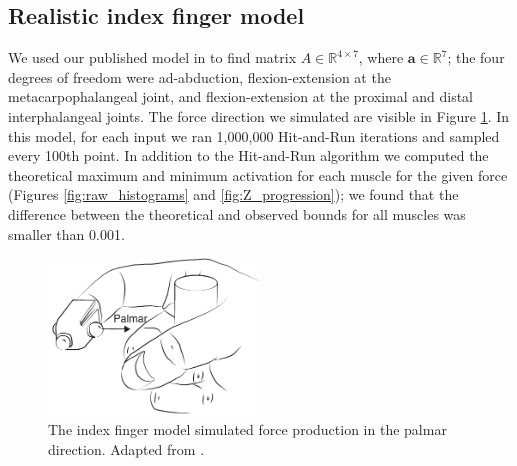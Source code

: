 \subsection{Realistic index finger model}
\label{ss:finger}
We used our published model in \cite{Valero-Cuevas1998Large} to find matrix $A \in \mathbb{R}^{4 \times 7}$, where $\textbf{a} \in \mathbb{R}^7$; the four degrees of freedom were ad-abduction, flexion-extension at the metacarpophalangeal joint, and flexion-extension at the proximal and distal interphalangeal joints.
The force direction we simulated are visible in Figure \ref{fig:finger}.
In this model, for each input we ran 1,000,000 Hit-and-Run iterations and sampled every 100th point.
In addition to the Hit-and-Run algorithm we computed the theoretical maximum and minimum activation for each muscle for the given force (Figures \ref{fig:raw_histograms} and \ref{fig:Z_progression}); we found that the difference between the theoretical and observed bounds for all muscles was smaller than 0.001.

\begin{figure}[htbp]
  \centering
  \includegraphics[width=0.5\textwidth]{sections/figs/finger.pdf}
  \caption{The index finger model simulated force production in the palmar direction. Adapted from \cite{Valero-Cuevas1998Large}.}
  \label{fig:finger}
\end{figure}

